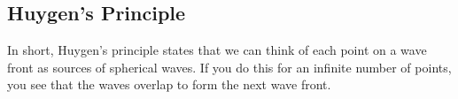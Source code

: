 \documentclass[class=article, crop=false]{standalone}
\begin{document}
  \subsection{Huygen's Principle}
  In short, Huygen's principle states that we can think of each point on a wave front as sources of spherical waves. If you do this for an infinite number of points, you see that the waves overlap to form the next wave front.
\end{document}
